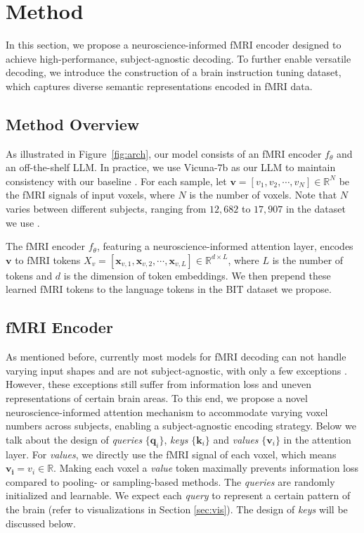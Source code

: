 \section{Method}
\label{sec:method}
In this section, we propose a neuroscience-informed fMRI encoder designed to achieve high-performance, subject-agnostic decoding. To further enable versatile decoding, we introduce the construction of a brain instruction tuning dataset, which captures diverse semantic representations encoded in fMRI data.

\subsection{Method Overview}
As illustrated in Figure~\ref{fig:arch}, our model consists of an fMRI encoder $f_\theta$ and an off-the-shelf LLM. In practice, we use Vicuna-7b \cite{zheng2023judging} as our LLM to maintain consistency with our baseline \cite{xia2024umbrae}. For each sample, let $\boldsymbol{v} = [v_1, v_2, \cdots, v_N]\in \mathbb{R}^N$ be the fMRI signals of input voxels, where $N$ is the number of voxels. Note that $N$ varies between different subjects, ranging from $12,682$ to $17,907$ in the dataset we use \cite{allen2022massive}.

The fMRI encoder $f_\theta$, featuring a neuroscience-informed attention layer, encodes $\boldsymbol{v}$ to fMRI tokens $X_v = [\boldsymbol{x}_{v,1}, \boldsymbol{x}_{v,2}, \cdots, \boldsymbol{x}_{v,L}] \in \mathbb{R}^{d\times L}$, where $L$ is the number of tokens and $d$ is the dimension of token embeddings. We then prepend these learned fMRI tokens to the language tokens in the BIT dataset we propose.

\subsection{fMRI Encoder}
As mentioned before, currently most models for fMRI decoding can not handle varying input shapes and are not subject-agnostic, with only a few exceptions \cite{mai2023unibrain}. However, these exceptions still suffer from information loss and uneven representations of certain brain areas. To this end, we propose a novel neuroscience-informed attention mechanism to accommodate varying voxel numbers across subjects, enabling a subject-agnostic encoding strategy. Below we talk about the design of \textit{queries} $\{\boldsymbol{q}_i\}$, \textit{keys} $\{\boldsymbol{k}_i\}$ and \textit{values} $\{\boldsymbol{v}_i\}$ in the attention layer. For \textit{values}, we directly use the fMRI signal of each voxel, which means $\boldsymbol{v_i} = v_i \in \mathbb{R}$. Making each voxel a \textit{value} token maximally prevents information loss compared to pooling- \cite{wang2024mindbridge} or sampling-based \cite{mai2023unibrain} methods. The \textit{queries} are randomly initialized and learnable. We expect each \textit{query} to represent a certain pattern of the brain (refer to visualizations in Section \ref{sec:vis}). The design of \textit{keys} will be discussed below.

